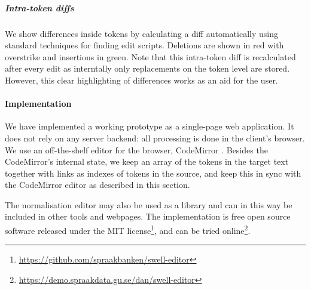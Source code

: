\documentclass[10pt, a4paper]{article}
\newcommand{\dan}[1]{{\color{Fuchsia}{Dan: #1}}}
\newcommand{\elena}[1]{{\color{BrickRed}{Elena: #1}}}
\newcommand{\mats}[1]{{\color{Blue}{Mats: #1}}}
\begin{document}
\subparagraph{Intra-token diffs} We show differences inside tokens by
calculating a diff automatically using standard techniques for finding
edit scripts.  Deletions are shown in red with overstrike and insertions
in green.  Note that this intra-token diff is recalculated after every edit
as interntally only replacements on the token level are stored.  However,
this clear highlighting of differences works as an aid for the user.

\paragraph{Implementation}
We have implemented a working prototype as a single-page web application.
It does not rely on any server backend: all processing is done in the
client's browser. We use an off-the-shelf editor for the browser,
CodeMirror \cite{CodeMirror}.
Besides the CodeMirror's internal state, we keep an array of the tokens in the
target text together with links as indexes of tokens in the source,
and keep this in sync with the CodeMirror editor as described in this section.

The normalisation editor may also be used as a library and can in this way
be included in other tools and webpages.
The implementation is free open source software released under the
MIT license\footnote{\url{https://github.com/spraakbanken/swell-editor}},
and can be tried online\footnote{\url{https://demo.spraakdata.gu.se/dan/swell-editor}}.

\end{document}
